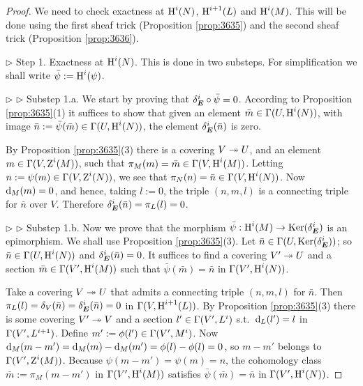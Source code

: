 \begin{proof}
We need to check exactness at $\operatorname{H}^{i}(N)$, $\operatorname{H}^{i + 1}(L)$  and
$\operatorname{H}^{i}(M)$. This will be done using the first sheaf trick (Proposition 
\ref{prop:3635}) and the second sheaf trick (Proposition \ref{prop:3636}). 

\medskip \noindent 
$\triangleright$  Step 1. 
Exactness at $\operatorname{H}^{i}(N)$. This is done in two substeps. 
For simplification we shall write $\bar{\psi} := \operatorname{H}^{i}(\psi)$. 

\medskip \noindent 
$\triangleright$  $\triangleright$ Substep 1.a.
We start by proving that 
$\delta_{\boldsymbol{E}}^i \circ \bar{\psi} = 0$.
According to Proposition \ref{prop:3635}(1) it suffices 
to show that given an element 
$\bar{m} \in \Gamma(U, \operatorname{H}^{i}(N))$, 
with image 
$\bar{n} := \bar{\psi}(\bar{m}) \in \Gamma(U, \operatorname{H}^{i}(N))$, 
the element 
$\delta_{\boldsymbol{E}}^i(\bar{n})$ is zero. 

By Proposition \ref{prop:3635}(3) there is a covering $V \twoheadrightarrow U$, and an 
element $m \in \Gamma(V, \operatorname{Z}^{i}(M))$, 
such that 
$\pi_M(m) = \bar{m} \in  \Gamma(V, \operatorname{H}^{i}(M))$. 
Letting $n := \psi(m) \in  \Gamma(V, \operatorname{Z}^{i}(N))$, 
we see that $\pi_N(n) = \bar{n} \in  \Gamma(V, \operatorname{H}^{i}(N))$.
Now $\mathrm{d}_M(m) = 0$, and hence, taking $l := 0$, the triple $(n, m, l)$
is a connecting triple for $\bar{n}$ over $V$. Therefore
$\delta_{\boldsymbol{E}}^i(\bar{n}) = \pi_L(l) = 0$.

\medskip \noindent 
$\triangleright$  $\triangleright$  Substep 1.b.
Now we prove that the morphism 
$\bar{\psi} : \operatorname{H}^{i}(M) \to \operatorname{Ker}(\delta_{\boldsymbol{E}}^i)$
is an epimorphism. 
We shall use Proposition \ref{prop:3635}(3). Let 
$\bar{n} \in \Gamma(U, \operatorname{Ker}(\delta_{\boldsymbol{E}}^i))$; 
so $\bar{n} \in \Gamma(U, \operatorname{H}^{i}(N))$ and
$\delta_{\boldsymbol{E}}^i(\bar{n}) = 0$. 
It suffices to find a covering $V' \twoheadrightarrow U$ and a section 
$\bar{m} \in \Gamma(V', \operatorname{H}^{i}(M))$ such that 
$\bar{\psi}(\bar{m}) = \bar{n}$ in $\Gamma(V', \operatorname{H}^{i}(N))$. 

Take a covering $V \twoheadrightarrow U$  that admits a connecting triple $(n, m, l)$ for 
$\bar{n}$. Then 
$\pi_L(l) = \delta_{V}(\bar{n}) = \delta_{\boldsymbol{E}}^i(\bar{n}) = 0$
in $\Gamma(V, \operatorname{H}^{i + 1}(L))$. 
By Proposition \ref{prop:3635}(3) there is some covering 
$V' \twoheadrightarrow V$ and a section $l' \in \Gamma(V', L^{i})$ s.t.\ 
$\mathrm{d}_L(l') = l$ in $\Gamma(V', L^{i + 1})$. 
Define $m' := \phi(l') \in \Gamma(V', M^{i})$. 
Now 
$\mathrm{d}_M(m - m') = \mathrm{d}_M(m) - \mathrm{d}_M(m') = \phi(l) - \phi(l) = 0$,
so $m - m'$ belongs to $\Gamma(V', \operatorname{Z}^{i}(M))$. 
Because
$\psi(m - m') = \psi(m) = n$,
the cohomology class 
$\bar{m} := \pi_M(m - m')$ in $\Gamma(V', \operatorname{H}^{i}(M))$
satisfies $\bar{\psi}(\bar{m}) = \bar{n}$
in $\Gamma(V', \operatorname{H}^{i}(N))$. 



\end{proof}
